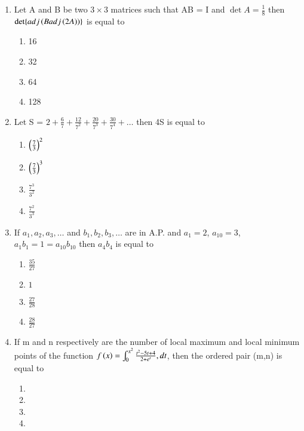 \documentclass[journal]{IEEEtran}
\begin{document}
\begin{enumerate}
\item Let A and B be two $3\times3$ matrices such that AB = I and $\det{A} = \frac{1}{8}$ then $\det\{adj\left(Badj\left(2A\right)\right)\}$ is equal to 
\begin{multicols}{2}
    \begin{enumerate}
        \item 16
        \item 32
        \item 64
        \item 128
    \end{enumerate}
\end{multicols}

\item Let S = $2+\frac{6}{7} + \frac{12}{7^2} + \frac{20}{7^3} + \frac{30}{7^4}+\dots$ then 4S is equal to 
\begin{multicols}{2}
    \begin{enumerate}
        \item $\left(\frac{7}{3}\right)^2$
        \item $\left(\frac{7}{3}\right)^3$
        \item $\frac{7^3}{3^2}$
        \item $\frac{7^2}{3^3}$
    \end{enumerate}
\end{multicols}

\item If $a_1, a_2, a_3, \dots$ and $b_1, b_2, b_3, \dots$ are in A.P. and $a_1 = 2$, $a_{10} = 3$, $a_1b_1 = 1 = a_{10}b_{10}$ then $a_4b_4$ is equal to 
\begin{multicols}{2}
    \begin{enumerate}
        \item $\frac{35}{27}$
        \item $1$
        \item $\frac{27}{28}$
        \item $\frac{28}{27}$
    \end{enumerate}
\end{multicols}

\item If m and n respectively are the number of local maximum and local minimum points of the function $f\left(x\right) = \int_0^{x^2} \frac{t^2-5t+4}{2+e^t}, dt$, then the ordered pair (m,n) is equal to
\begin{multicols}{2}
    \begin{enumerate}
        \item {}
        \item {}
        \item {}
        \item {}
    \end{enumerate}
\end{multicols}


\end{enumerate}
\end{document}
